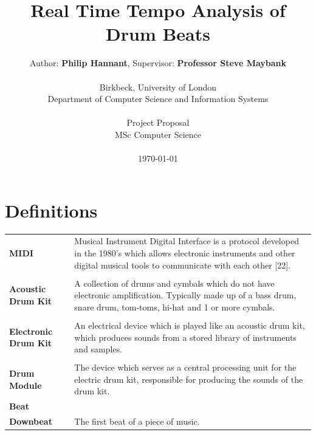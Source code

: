 \documentclass[a4paper, 11pt]{article}
\date{}
\begin{document}
 

\LARGE\title{Real Time Tempo Analysis of Drum Beats}

\LARGE\author{Author: \textbf{Philip Hannant}, Supervisor: \textbf{Professor Steve Maybank}\\
\\Birkbeck, University of London\\
Department of Computer Science and Information Systems\\
\\Project Proposal\\
MSc Computer Science\\
\\\monthyeardate\today
}





\normalsize


\maketitle
\newpage
\tableofcontents
\clearpage

\section*{Definitions}
\begin{tabular}{l p{4.5in}  }
\textbf{MIDI} & Musical Instrument Digital Interface is a protocol developed in the 1980's which allows electronic instruments and other digital musical tools to communicate with each other [22].\\\\
\textbf{Acoustic Drum Kit} & A collection of drums and cymbals which do not have electronic amplification. Typically made up of a bass drum, snare drum, tom-toms, hi-hat and 1 or more cymbals.\\\\
\textbf{Electronic Drum Kit} & An electrical device which is played like an acoustic drum kit, which produces sounds from a stored library of instruments and samples.\\\\
\textbf{Drum Module} & The device which serves as a central processing unit for the electric drum kit, responsible for producing the sounds of the drum kit.\\
\textbf{Beat} & \\
\textbf{Downbeat} & The first beat of a piece of music.\\
\end{tabular}
\clearpage
\end{document}
